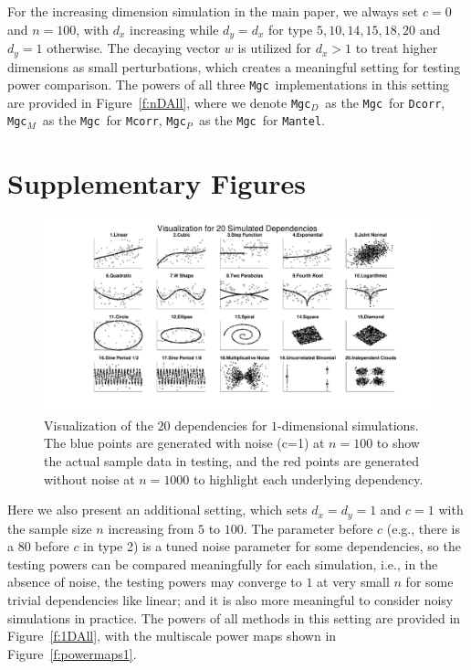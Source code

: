 \documentclass[11pt]{article}
\providecommand{\sct}[1]{{\sc \texttt{#1}}}
\newcommand{\Mgc}{\sct{Mgc}}
\newcommand{\Mgcp}{\sct{Mgc$_P$}}
\newcommand{\Mgcd}{\sct{Mgc$_D$}}
\newcommand{\Mgcm}{\sct{Mgc$_M$}}
\newcommand{\Dcorr}{\sct{Dcorr}}
\newcommand{\Mcorr}{\sct{Mcorr}}
\newcommand{\Mantel}{\sct{Mantel}}
\begin{document}
For the increasing dimension simulation in the main paper, we always set $c=0$ and $n=100$, with $d_{x}$ increasing while $d_{y}=d_{x}$ for type $5,10,14,15,18,20$ and $d_{y}=1$ otherwise. The decaying vector $w$ is utilized for $d_{x}>1$ to treat higher dimensions as small perturbations, which creates a meaningful setting for testing power comparison. The powers of all three \Mgc~implementations in this setting are provided in Figure~\ref{f:nDAll}, where we denote \Mgcd~as the \Mgc~for \Dcorr, \Mgcm~as the \Mgc~for \Mcorr, \Mgcp~as the \Mgc~for \Mantel.

\section{Supplementary Figures}
\label{appen:figs}


\begin{figure}[htbp]
\includegraphics[trim={5cm 0 3.5cm 0},clip, width=1.0\textwidth]{../Figures/FigSimVisual}
\caption{Visualization of the $20$ dependencies for $1$-dimensional simulations. The blue points are generated with noise (c=1) at $n=100$ to show the actual sample data in testing, and the red points are generated without noise at $n=1000$ to highlight each underlying dependency.
}
\label{f:dependencies}
\end{figure}




Here we also present an additional setting, which sets $d_{x}=d_{y}=1$ and $c=1$ with the sample size $n$ increasing from $5$ to $100$. The parameter before $c$ (e.g., there is a $80$ before $c$ in type 2) is a tuned noise parameter for some dependencies, so the testing powers can be compared meaningfully for each simulation, i.e., in the absence of noise, the testing powers may converge to $1$ at very small $n$ for some trivial dependencies like linear; and it is also more meaningful to consider noisy simulations in practice. The powers of all methods in this setting are provided in Figure~\ref{f:1DAll}, with the multiscale power maps shown in Figure~\ref{f:powermaps1}.
\end{document}
